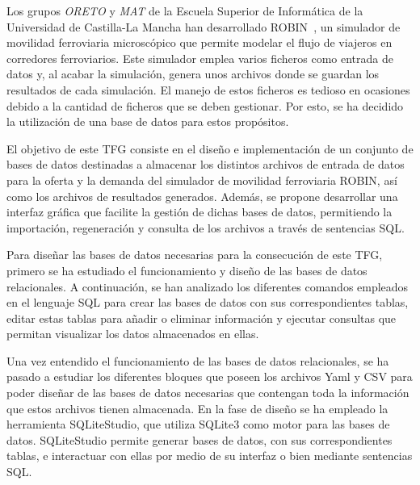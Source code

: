 \begin{resumen}


Los grupos \textit{ORETO} y \textit{MAT} de la Escuela Superior de Informática de la Universidad de Castilla-La Mancha han desarrollado \acrfull{ROBIN}~\cite{delCastilloHerrera2024ROBIN}, un simulador de movilidad ferroviaria microscópico que permite modelar el flujo de viajeros en corredores ferroviarios. Este simulador emplea varios ficheros como entrada de datos y, al acabar la simulación, genera unos archivos donde se guardan los resultados de cada simulación. El manejo de estos ficheros es tedioso en ocasiones debido a la cantidad de ficheros que se deben gestionar. Por esto, se ha decidido la utilización de una base de datos para estos propósitos.

El objetivo de este \acrlong{TFG} consiste en el diseño e implementación de un conjunto de bases de datos destinadas a almacenar los distintos archivos de entrada de datos para la oferta y la demanda del simulador de movilidad ferroviaria \acrshort{ROBIN}, así como los archivos de resultados generados. Además, se propone desarrollar una interfaz gráfica que facilite la gestión de dichas bases de datos, permitiendo la importación, regeneración y consulta de los archivos a través de sentencias \acrfull{SQL}.

Para diseñar las bases de datos necesarias para la consecución de este TFG, primero se ha estudiado el funcionamiento y diseño de las bases de datos relacionales. A continuación, se han analizado los diferentes comandos empleados en el lenguaje SQL para crear las bases de datos con sus correspondientes tablas, editar estas tablas para añadir o eliminar información y ejecutar consultas que permitan visualizar los datos almacenados en ellas.

Una vez entendido el funcionamiento de las bases de datos relacionales, se ha pasado a estudiar los diferentes bloques que poseen los archivos \acrshort{Yaml} y \acrshort{CSV} para poder diseñar de las bases de datos necesarias que contengan toda la información que estos archivos tienen almacenada. En la fase de diseño se ha empleado la herramienta SQLiteStudio, que utiliza SQLite3 como motor para las bases de datos. SQLiteStudio permite generar bases de datos, con sus correspondientes tablas, e interactuar con ellas por medio de su interfaz o bien mediante sentencias SQL.


\end{resumen}
